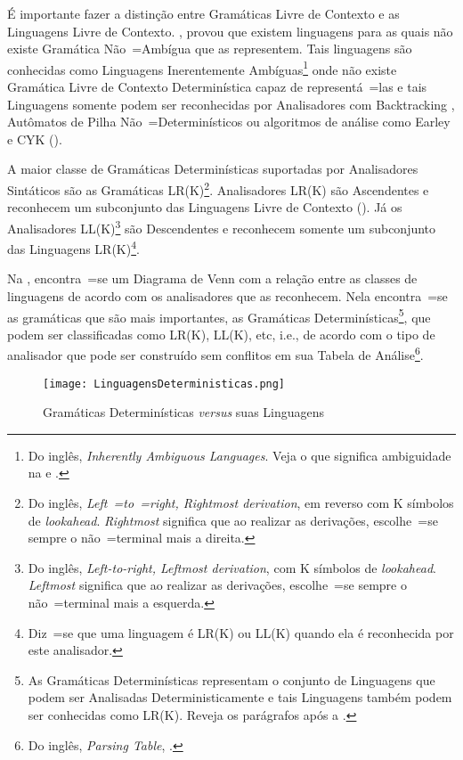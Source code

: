 É importante fazer a distinção entre Gramáticas Livre de Contexto e
as Linguagens Livre de Contexto.
,
provou que existem linguagens para as quais não existe Gramática Não~=Ambígua que as representem.
Tais linguagens são conhecidas como Linguagens Inerentemente Ambíguas\footnote{
Do inglês,
\textit{Inherently Ambiguous Languages}.
Veja o que significa ambiguidade na  e
.
}
onde não existe Gramática Livre de Contexto Determinística capaz de representá~=las e
tais Linguagens somente podem ser reconhecidas por Analisadores com Backtracking \cite{ahoCompilerDragonBook},
Autômatos de Pilha Não~=Determinísticos ou
algoritmos de análise como Earley e
CYK ().

A maior classe de Gramáticas Determinísticas suportadas por Analisadores Sintáticos são as Gramáticas LR(K)\footnote{
Do inglês, \textit{Left~=to~=right, Rightmost derivation},
em reverso com K símbolos de \textit{lookahead}.
\textit{Rightmost} significa que ao realizar as derivações,
escolhe~=se sempre o não~=terminal mais a direita.
}.
Analisadores LR(K) \cite{ahoCompilerDragonBook} são Ascendentes e
reconhecem um subconjunto das Linguagens Livre de Contexto ().
Já os Analisadores LL(K)\footnote{
Do inglês, \textit{Left-to-right, Leftmost derivation},
com K símbolos de \textit{lookahead}.
\textit{Leftmost} significa que ao realizar as derivações,
escolhe~=se sempre o não~=terminal mais a esquerda.
}
são Descendentes \cite{antlrBookTerrentParr,llStarAntlr,allStarAntlr} e
reconhecem somente um subconjunto das Linguagens LR(K)\footnote{
Diz~=se que uma linguagem é LR(K) ou
LL(K) quando ela é reconhecida por este analisador.
}.

Na ,
encontra~=se um Diagrama de Venn \cite{generalizedVennDiagrams} com a relação entre as classes de linguagens de acordo com os analisadores que as reconhecem.
Nela encontra~=se as gramáticas que são mais importantes,
as Gramáticas Determinísticas\footnote{
As Gramáticas Determinísticas representam o conjunto de Linguagens que podem ser Analisadas Deterministicamente e
tais Linguagens também podem ser conhecidas como LR(K).
Reveja os parágrafos após a .
},
que podem ser classificadas como LR(K),
LL(K), etc, i.e.,
de acordo com o tipo de analisador que pode ser construído sem conflitos em sua Tabela de Análise\footnote{
Do inglês, \textit{Parsing Table},
\cite{ahoCompilerDragonBook}.
}.
\begin{figure}[!htb]
\caption{Gramáticas Determinísticas \textit{versus} suas Linguagens}
\label{figure:LinguagensDeterministicas}
\centering
\texttt{[image: LinguagensDeterministicas.png]}
\end{figure}

